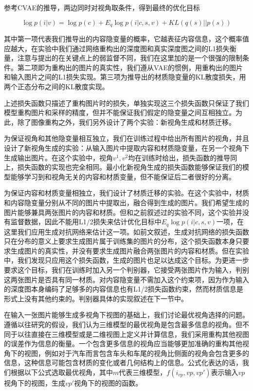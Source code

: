 \documentclass[UTF8,openany,AutoFakeBold,AutoFakeSlant,cs4size]{ctexbook}
\begin{document}
参考CVAE的推导，两边同时对视角取条件，得到最终的优化目标

\begin{equation}
	\log p(i | v)= \log p(c) + E_{q} \log p(i | c, s, v) + KL(q(s) || p(s))
\end{equation}

其中第一项代表我们推导出的内容隐变量的概率，它越表征内容信息，这个概率值应越大，在实验中我们通过网络重构出的深度图和真实深度图之间的L1损失衡量，注意与\cite{Wu2019DisentanglingCA}提出的在关键点上的弱监督不同，我们在这里加的是一个很强的限制条件。第二项即为重构出的图片的真实性，我们遵从VAE的惯例，用重构出的图片和输入图片之间的L1损失实现。第三项为推导出的材质隐变量的KL散度损失，用两个正态分布之间的KL散度实现。

上述损失函数只描述了重构图片时的损失，单独实现这三个损失函数只保证了我们模型重构图片和采样的精度，但并不能保证我们假定的隐变量之间互相独立。为此，除了图像重构之外，我们另外设计了两个实验：新视角生成和材质迁移。

为保证视角和其他隐变量相互独立，我们在训练过程中给出所有图片的视角，并且设计了新视角生成的实验：从输入图片中提取内容和材质隐变量，在另一个视角下生成输出图片。在这个实验中，视角$v^{1}, v^{2}​$均在训练时给出，损失函数的推导同上，损失函数的实现也完全相同。最小化新视角生成的损失函数能够保证我们的模型能够学习到和视角无关的内容和材质变量，但不能保证后二者很好的分离。

为保证内容和材质变量相独立，我们设计了材质迁移的实验。在这个实验中，材质和内容隐变量分别从不同的图片中提取出，融合得到生成的图片。我们希望生成的图片能够兼具两张图片的内容和材质。但和之前叙述过的实验不同，这个实验并没有监督数据，因此不能用L1/2损失来估计优化目标中$E_{q} \log p(i | c, s, v)$一项，在这里我们应用生成对抗网络来估计这一项。如前文叙述，生成对抗网络的损失函数只在分布的意义上要求生成图片属于训练集的图片的分布，这个损失函数本身只要求生成图片的真实性，并没有要求生成图片融合两张图片的内容和材质。但在实验中，我们发现只应用这个损失函数，生成的图片也足以达成这个目标。为更进一步要求这个目标，我们在训练时加入另一个判别器，它接受两张图片作为输入，判别这两张图片是否具有同一材质。对内容隐变量不需加入这个约束项，因为作为输入的深度图本身编码了足够多的内容信息也有L1/2损失函数约束，然而材质信息是形式上没有其他约束的。判别器具体的实现叙述在下一节中。

在输入一张图片能够生成多视角下视图的基础上，我们讨论最优视角选择的问题。遵循以往研究的假设，我们认为三维模型的最优视角是包含最多信息的视角。但不同于以往直接在三维模型或是二维视图上定义并计算信息，我们采用重构其他视图的误差作为信息的衡量。一个包含更多信息的视角应当能够更加准确的重构其他视角下的视图，例如对于汽车而言包含车头和车尾的视角比侧面的视角会包含更多的信息，这种信息可能包含材质的变化或者几何结构上的信息。公式化表达的话，我们根据以下公式选取最优视角，其中$m$代表三维模型，$f(i_{vp}, vp, vp')$表示输入$vp$视角下的视图，生成$vp'$视角下的视图的函数。
\end{document}
